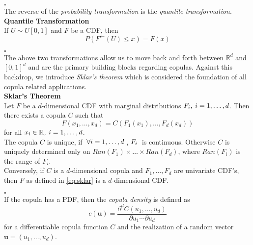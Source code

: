 \hfill $\square$ \\

The reverse of the \textit{probability transformation} is the \textit{quantile transformation}.\\

\textbf{Quantile Transformation}\\
If $U \sim U[0,1]$ and $F$ be a \ac{CDF}, then
\begin{equation}
P\left(F^{\leftarrow}(U) \leq x\right)=F(x)
\label{eq:quantile_transformation}
\end{equation}

\hfill $\square$ \\

The above two transformations allow us to move back and forth between $\mathbb{R}^d$ and $[0,1]^d$ and are the primary building blocks regarding copulas. Against this backdrop, we introduce \textit{Sklar's theorem} which is considered the foundation of all copula related applications.\\




\textbf{Sklar's Theorem} \cite{sklar1959fonctions} \\
Let $F$ be a $d$-dimensional \ac{CDF} with marginal distributions $F_{i}, \hspace{0.25em} i = 1, \ldots, d$.
Then there exists a copula $C$ such that
\begin{equation}
F(x_1, \ldots, x_d) = C (F_1(x_1), \ldots, F_d(x_d))
\label{eq:sklar}
\end{equation}
for all $x_i \in \mathbb{R}, \hspace{0.25em} i = 1, \ldots, d $.\\
The copula $C$ is unique, if $ \hspace{0.25em} \forall i = 1, \ldots, d \hspace{0.25em}$,  $F_i \hspace{0.25em}$  is continuous. Otherwise $C$ is uniquely determined only on
$Ran(F_1) \times \ldots \times Ran(F_d)$, where $Ran(F_{i})$ is the range of $F_i$.\\
Conversely, if $C$ is a $d$-dimensional copula and $F_1, \ldots, F_d$ are univariate \ac{CDF}'s, then $F$ as defined in \autoref{eq:sklar} is a 
$d$-dimensional \ac{CDF}.

\hfill $\square$ \\


If the copula has a \ac{PDF}, then the \textit{copula density} is defined as
\begin{equation}
c(\mathbf{u})=\frac{\partial^{d} C\left(u_{1}, \ldots, u_{d}\right)}{\partial u_{1} \cdots \partial u_{d}} 
\label{eq:copula_density_1}
\end{equation}
for a differentiable copula function $C$ and the realization of a random vector $ \bm{u} = (u_1, \ldots, u_d)$.\\


